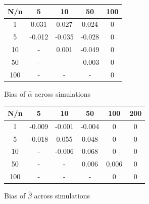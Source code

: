 \documentclass{article} %
\numberwithin{equation}{section} %
\numberwithin{figure}{section} %
\numberwithin{table}{section} %
\begin{document}
\begin{figure}[h] \label{bias_alpha}
\begin{center}
\begin{tabular}{ |c|c|c|c|c| }
 \hline
 N/n & 5 & 10 & 50 & 100  \\
 \hline
 1 & 0.031 & 0.027 & 0.024 & 0  \\
 \hline
 5 & -0.012 & -0.035 & -0.028 & 0  \\
 \hline
 10 & - & 0.001 & -0.049 & 0  \\
 \hline
 50 & - & - & -0.003 & 0  \\
 \hline
 100 & - & - & - & 0  \\
 \hline
\end{tabular}
\end{center}
\caption{Bias of $\hat{\alpha}$ across simulations}
\end{figure}

\begin{figure}[h] \label{bias_alpha}
\begin{center}
\begin{tabular}{ |c|c|c|c|c|c| }
 \hline
 N/n & 5 & 10 & 50 & 100 & 200 \\
 \hline
 1 & -0.009 & -0.001 & -0.004 & 0 & 0\\
 \hline
 5 & -0.018 & 0.055 & 0.048 & 0 &  0\\
 \hline
 10 & - & -0.006 & 0.068 & 0 & 0 \\
 \hline
 50 & - & - & 0.006 & 0.006  & 0\\
 \hline
 100 & - & - & - & 0  & 0\\
 \hline
\end{tabular}
\caption{Bias of $\hat{\beta}$ across simulations}
\end{center}
\end{figure}
\end{document}
